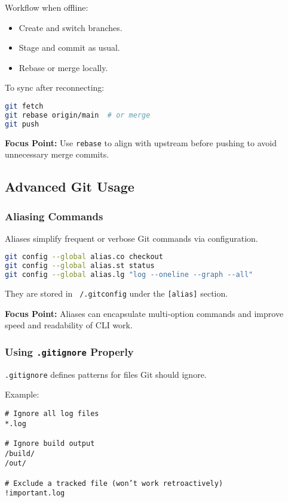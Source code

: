 \documentclass[a4paper,12pt]{article}
\begin{document}
Workflow when offline:
\begin{itemize}
  \item Create and switch branches.
  \item Stage and commit as usual.
  \item Rebase or merge locally.
\end{itemize}

To sync after reconnecting:
\begin{lstlisting}[language=bash]
git fetch
git rebase origin/main  # or merge
git push
\end{lstlisting}

\textbf{Focus Point:} Use \texttt{rebase} to align with upstream before pushing to avoid unnecessary merge commits.

\subsection{Advanced Git Usage}

\subsubsection{Aliasing Commands}

Aliases simplify frequent or verbose Git commands via configuration.

\begin{lstlisting}[language=bash]
git config --global alias.co checkout
git config --global alias.st status
git config --global alias.lg "log --oneline --graph --all"
\end{lstlisting}

They are stored in \texttt{~/.gitconfig} under the \texttt{[alias]} section.

\textbf{Focus Point:} Aliases can encapsulate multi-option commands and improve speed and readability of CLI work.

\subsubsection{Using \texttt{.gitignore} Properly}

\texttt{.gitignore} defines patterns for files Git should ignore.

Example:

\begin{lstlisting}
# Ignore all log files
*.log

# Ignore build output
/build/
/out/

# Exclude a tracked file (won’t work retroactively)
!important.log
\end{lstlisting}
\end{document}
